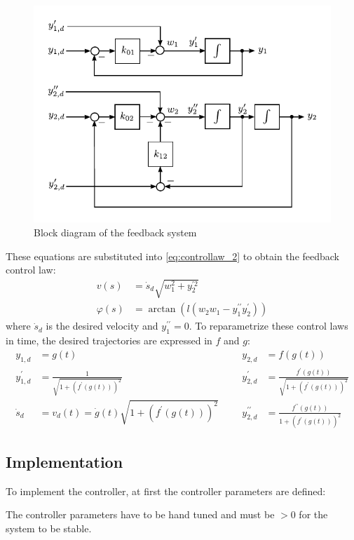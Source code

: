 \documentclass[a4paper,11pt,headings=standardclasses,parskip=half]{scrartcl}
\newcommand{\listcode}[3]{}
\newcommand{\listcodefbcontrol}[2]{\listcode{#1}{#2}{../sim/03_car_feedback_control.py}}
\begin{document}
\begin{figure}[ht]
\centering
\includegraphics[scale=1]{img/linear_system_feedback.pdf}
\caption{Block diagram of the feedback system}
\label{fig:linear_system_feedback}
\end{figure}
These equations are substituted into \eqref{eq:controllaw_2} to obtain the feedback control law:
\begin{subequations}
\begin{align}
v(s) &= \dot{s}_d\sqrt{w_1^2+y_2^{\prime 2}}\\
\varphi(s) &= \arctan\left(l (w_2w_1-y_1^{\prime\prime}y_2^\prime)\right)
\end{align}
\end{subequations}
where $\dot{s}_d$ is the desired velocity  and $y_1^{\prime\prime} = 0$.
To reparametrize these control laws in time, the desired trajectories are expressed in $f$ and $g$:
\begin{subequations}
\begin{align*}
y_{1,d} &= g(t)  &&& y_{2,d} &= f(g(t))\\
y_{1,d}^\prime &= \frac{1}{\sqrt{1+(f^{\prime }(g(t)))^2}} &&& y_{2,d}^\prime &= \frac{f^{\prime }(g(t))}{\sqrt{1+(f^{\prime }(g(t)))^2}}\\
\dot{s}_d &= v_d(t) = \dot g(t) \sqrt{1 + (f^\prime(g(t)))^2}&&& y_{2,d}^{\prime\prime} &= \frac{f^{\prime \prime}(g(t))}{1+(f^{\prime }(g(t)))^2}
\end{align*}
\end{subequations}
\subsection{Implementation}
To implement the controller, at first the controller parameters are defined:
\listcodefbcontrol{91}{94}
The controller parameters have to be hand tuned and must be $>0$ for the system to be stable.
\end{document}
